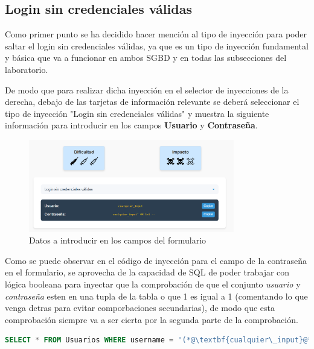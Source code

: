 \documentclass[a4paper,12pt]{article}
\begin{document}

\subsection{Login sin credenciales válidas}
Como primer punto se ha decidido hacer mención al tipo de inyección para poder saltar el login sin credenciales válidas, ya que es un tipo de inyección fundamental y básica que va a funcionar en ambos SGBD
y en todas las subsecciones del laboratorio.

De modo que para realizar dicha inyección en el selector de inyecciones de la derecha, debajo de las tarjetas de información relevante se deberá seleccionar el tipo de inyección "Login sin credenciales válidas"
y muestra la siguiente información para introducir en los campos \textbf{Usuario} y \textbf{Contraseña}.

\begin{figure}[H]
    \centering
    \includegraphics[width=0.8\textwidth]{Imagenes/error3.png}
    \caption{Datos a introducir en los campos del formulario}
\end{figure}

Como se puede observar en el código de inyección para el campo de la contraseña en el formulario, se aprovecha de la capacidad de SQL de poder trabajar con lógica booleana para inyectar
que la comprobación de que el conjunto \textit{usuario} y \textit{contraseña} esten en una tupla de la tabla o que 1 es igual a 1 (comentando lo que venga detras para evitar comporbaciones secundarias),
de modo que esta comprobación siempre va a ser cierta por la segunda parte de la comprobación.

\begin{lstlisting}[language=SQL]
SELECT * FROM Usuarios WHERE username = '(*@\textbf{cualquier\_input}@*)' AND password = '(*@\textbf{cualquier\_input' OR 1=1 --}@*)'
\end{lstlisting}
\end{document}
